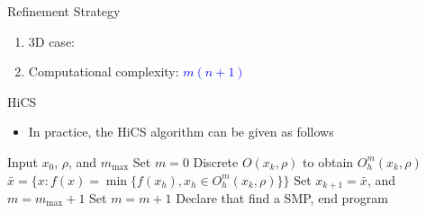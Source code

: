 \documentclass{beamer}
\newcommand{\bmx}{x}
\begin{document}
\begin{frame}{Refinement Strategy}
\begin{itemize}
\begin{enumerate}
\begin{figure}[!htbp]
	\label{fig:obset:sketch}
	\end{figure}
		\item 3D case:
	  \vspace{0.5cm}
	\item Computational complexity: \textcolor{blue}{$m(n+1)$}
	\end{enumerate}
\end{itemize}

\end{frame}


\begin{frame}{HiCS}

\begin{itemize}
	\item In practice, the HiCS algorithm can be given as follows
\end{itemize}

\begin{algorithm}[H]
\footnotesize{
	\caption{HiCS}
\begin{algorithmic}[1]
	\STATE Input $x_0$, $\rho$, and $m_{\max}$
		\STATE Set $m=0$
			\STATE Discrete $O(x_k,\rho)$ to obtain $O^m_h(x_k,\rho)$
			\STATE $\bar{x} = \{x: f(x)=\min\{f(x_h), x_h\in O^m_h(x_k, \rho) \} \}$
				\STATE Set $x_{k+1}=\bar{x}$, and $m=m_{\max}+1$
			\ELSE
				\STATE Set $m = m+1$
			\ENDIF
		\ELSE
			\STATE Declare that find a SMP, end program
		\ENDIF
	\ENDFOR
\end{algorithmic}
}
\end{algorithm}
\end{frame}
\end{document}
